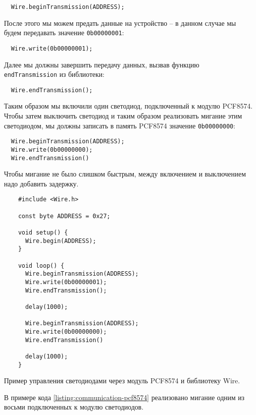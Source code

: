\documentclass[../sparc.tex]{subfiles}
\begin{document}
\begin{verbatim}
  Wire.beginTransmission(ADDRESS);
\end{verbatim}

После этого мы можем предать данные на устройство -- в данном случае мы будем
передавать значение \texttt{0b00000001}:

\begin{verbatim}
  Wire.write(0b00000001);
\end{verbatim}

Далее мы должны завершить передачу данных, вызвав функцию
\texttt{endTransmission} из библиотеки:

\begin{verbatim}
  Wire.endTransmission();
\end{verbatim}

Таким образом мы включили один светодиод, подключенный к модулю PCF8574.  Чтобы
затем выключить светодиод и таким образом реализовать мигание этим светодиодом,
мы должны записать в память PCF8574 значение \texttt{0b00000000}:

\begin{verbatim}
  Wire.beginTransmission(ADDRESS);
  Wire.write(0b00000000);
  Wire.endTransmission()
\end{verbatim}

Чтобы мигание не было слишком быстрым, между включением и выключением надо
добавить задержку.

\begin{listing}[H]
  \begin{verbatim}
    #include <Wire.h>

    const byte ADDRESS = 0x27;

    void setup() {
      Wire.begin(ADDRESS);
    }

    void loop() {
      Wire.beginTransmission(ADDRESS);
      Wire.write(0b00000001);
      Wire.endTransmission();

      delay(1000);

      Wire.beginTransmission(ADDRESS);
      Wire.write(0b00000000);
      Wire.endTransmission()

      delay(1000);
    }
  \end{verbatim}
  \label{listing:communication-pcf8574}
  \caption{Пример управления светодиодами через модуль PCF8574 и библиотеку
    Wire.}
\end{listing}

В примере кода \ref{listing:communication-pcf8574} реализовано мигание одним из
восьми подключенных к модулю светодиодов.
\end{document}
